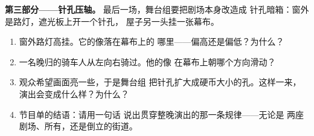 \begin{problem}
\medskip\noindent\textbf{第三部分——针孔压轴。}
最后一场，舞台组要把剧场本身改造成
针孔暗箱：窗外是路灯，遮光板上开一个针孔，
屋子另一头挂一张幕布。
\begin{enumerate}[resume]
  \item 窗外路灯高挂。它的像落在幕布上的
        哪里——偏高还是偏低？为什么？
  \item 一名晚归的骑车人从左向右骑过。他的像
        在幕布上朝哪个方向滑动？
  \item 观众希望画面亮一些，于是舞台组
        把针孔扩大成硬币大小的孔。这样一来，
        演出会变成什么样？为什么？
  \item 节目单的结语：请用一句话
        说出贯穿整晚演出的那一条规律——无论是
        两座剧场、所有，还是倒立的街道。
\end{enumerate}
\end{problem}
